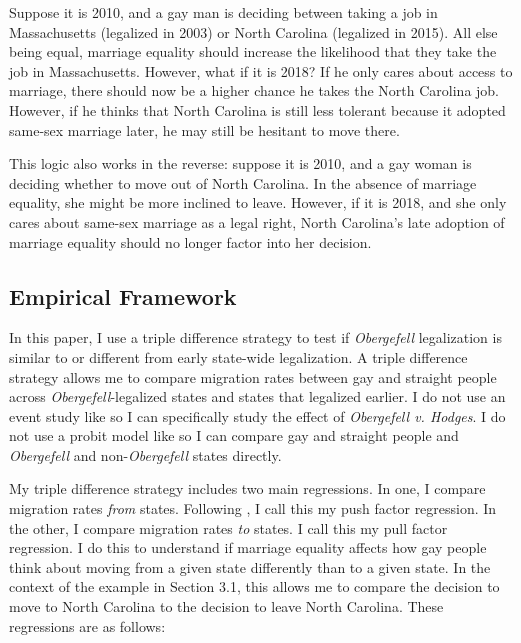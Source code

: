 \documentclass[12pt,letterpaper]{article}
\begin{document}
Suppose it is 2010, and a gay man is deciding between taking a job in Massachusetts (legalized in 2003) or North Carolina (legalized in 2015). All else being equal, marriage equality should increase the likelihood that they take the job in Massachusetts. However, what if it is 2018? If he only cares about access to marriage, there should now be a higher chance he takes the North Carolina job. However, if he thinks that North Carolina is still less tolerant because it adopted same-sex marriage later, he may still be hesitant to move there.

This logic also works in the reverse: suppose it is 2010, and a gay woman is deciding whether to move out of North Carolina. In the absence of marriage equality, she might be more inclined to leave. However, if it is 2018, and she only cares about same-sex marriage as a legal right, North Carolina’s late adoption of marriage equality should no longer factor into her decision. 


\subsection{Empirical Framework}

In this paper, I use a triple difference strategy to test if \textit{Obergefell} legalization is similar to or different from early state-wide legalization. A triple difference strategy allows me to compare migration rates between gay and straight people across \textit{Obergefell}-legalized states and states that legalized earlier. I do not use an event study like \citet{1} so I can specifically study the effect of \textit{Obergefell v. Hodges}. I do not use a probit model like \citet{12} so I can compare gay and straight people and \textit{Obergefell} and non-\textit{Obergefell} states directly.

My triple difference strategy includes two main regressions. In one, I compare migration rates \textit{from} states. Following \citet{12}, I call this my push factor regression. In the other, I compare migration rates \textit{to} states. I call this my pull factor regression. I do this to understand if marriage equality affects how gay people think about moving from a given state differently than to a given state. In the context of the example in Section 3.1, this allows me to compare the decision to move to North Carolina to the decision to leave North Carolina. These regressions are as follows:
\end{document}
